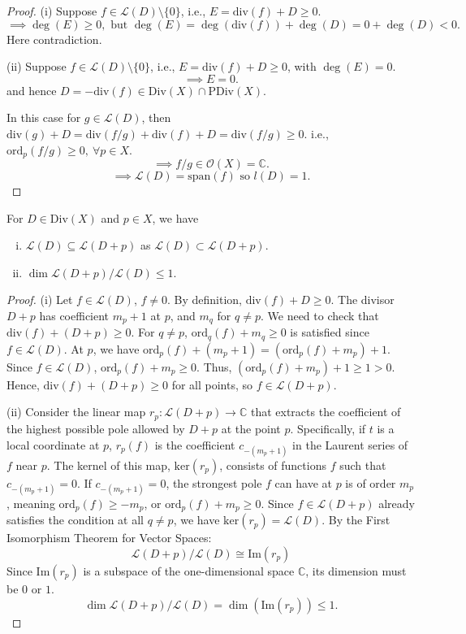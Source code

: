 \documentclass{article}
\begin{document}
\begin{proof}
(i) Suppose $f \in \mathcal{L}(D) \setminus \{0\}$, i.e., $E = \mathrm{div}(f) + D \ge 0$.
$$ \implies \deg(E) \ge 0, \text{ but } \deg(E) = \deg(\mathrm{div}(f)) + \deg(D) = 0 + \deg(D) < 0. $$
Here contradiction.

(ii) Suppose $f \in \mathcal{L}(D) \setminus \{0\}$, i.e., $E = \mathrm{div}(f) + D \ge 0$, with $\deg(E) = 0$.
$$ \implies E = 0. $$
and hence $D = -\mathrm{div}(f) \in \mathrm{Div}(X) \cap \mathrm{PDiv}(X)$.

In this case for $g \in \mathcal{L}(D)$, then $\mathrm{div}(g) + D = \mathrm{div}(f/g) + \mathrm{div}(f) + D = \mathrm{div}(f/g) \ge 0$.
i.e., $\mathrm{ord}_p(f/g) \ge 0, \ \forall p \in X$.
$$ \implies f/g \in \mathcal{O}(X) = \mathbb{C}. $$
$$ \implies \mathcal{L}(D) = \mathrm{span}(f) \text{ so } l(D) = 1. $$
\end{proof}

\begin{proposition}
For $D \in \mathrm{Div}(X)$ and $p \in X$, we have
\begin{enumerate}[(i)]
    \item $\mathcal{L}(D) \subseteq \mathcal{L}(D+p)$ as $\mathcal{L}(D) \subset \mathcal{L}(D+p)$.
    \item $\dim \mathcal{L}(D+p)/\mathcal{L}(D) \le 1$.
\end{enumerate}
\end{proposition}

\begin{proof}
(i) Let $f \in \mathcal{L}(D)$, $f \ne 0$. By definition, $\mathrm{div}(f) + D \ge 0$.
The divisor $D+p$ has coefficient $m_p+1$ at $p$, and $m_q$ for $q \ne p$.
We need to check that $\mathrm{div}(f) + (D+p) \ge 0$.
For $q \ne p$, $\mathrm{ord}_q(f) + m_q \ge 0$ is satisfied since $f \in \mathcal{L}(D)$.
At $p$, we have $\mathrm{ord}_p(f) + (m_p+1) = (\mathrm{ord}_p(f) + m_p) + 1$.
Since $f \in \mathcal{L}(D)$, $\mathrm{ord}_p(f) + m_p \ge 0$.
Thus, $(\mathrm{ord}_p(f) + m_p) + 1 \ge 1 > 0$.
Hence, $\mathrm{div}(f) + (D+p) \ge 0$ for all points, so $f \in \mathcal{L}(D+p)$.

(ii) Consider the linear map $r_p: \mathcal{L}(D+p) \to \mathbb{C}$ that extracts the coefficient of the highest possible pole allowed by $D+p$ at the point $p$. Specifically, if $t$ is a local coordinate at $p$, $r_p(f)$ is the coefficient $c_{-(m_p+1)}$ in the Laurent series of $f$ near $p$.
The kernel of this map, $\mathrm{ker}(r_p)$, consists of functions $f$ such that $c_{-(m_p+1)} = 0$.
If $c_{-(m_p+1)} = 0$, the strongest pole $f$ can have at $p$ is of order $m_p$, meaning $\mathrm{ord}_p(f) \ge -m_p$, or $\mathrm{ord}_p(f) + m_p \ge 0$.
Since $f \in \mathcal{L}(D+p)$ already satisfies the condition at all $q \ne p$, we have $\mathrm{ker}(r_p) = \mathcal{L}(D)$.
By the First Isomorphism Theorem for Vector Spaces:
$$ \mathcal{L}(D+p) / \mathcal{L}(D) \cong \mathrm{Im}(r_p) $$
Since $\mathrm{Im}(r_p)$ is a subspace of the one-dimensional space $\mathbb{C}$, its dimension must be $0$ or $1$.
$$ \dim \mathcal{L}(D+p)/\mathcal{L}(D) = \dim(\mathrm{Im}(r_p)) \le 1. $$
\end{proof}
\end{document}
